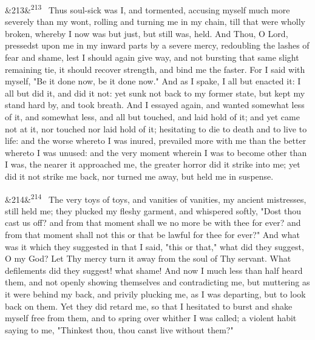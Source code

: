 \documentclass[12pt]{article}
\newcommand{\para}[1][]{\par\noindent\ifx&#1&\else\textsuperscript{\footnotesize #1}~\fi}
\begin{document}
\para[213] Thus soul-sick was I, and tormented, accusing myself much more severely than my wont, rolling and turning me in my chain, till that were wholly broken, whereby I now was but just, but still was, held. And Thou, O Lord, pressedst upon me in my inward parts by a severe mercy, redoubling the lashes of fear and shame, lest I should again give way, and not bursting that same slight remaining tie, it should recover strength, and bind me the faster. For I said with myself, "Be it done now, be it done now." And as I spake, I all but enacted it: I all but did it, and did it not: yet sunk not back to my former state, but kept my stand hard by, and took breath. And I essayed again, and wanted somewhat less of it, and somewhat less, and all but touched, and laid hold of it; and yet came not at it, nor touched nor laid hold of it; hesitating to die to death and to live to life: and the worse whereto I was inured, prevailed more with me than the better whereto I was unused: and the very moment wherein I was to become other than I was, the nearer it approached me, the greater horror did it strike into me; yet did it not strike me back, nor turned me away, but held me in suspense.

\para[214] The very toys of toys, and vanities of vanities, my ancient mistresses, still held me; they plucked my fleshy garment, and whispered softly, "Dost thou cast us off? and from that moment shall we no more be with thee for ever? and from that moment shall not this or that be lawful for thee for ever?" And what was it which they suggested in that I said, "this or that," what did they suggest, O my God? Let Thy mercy turn it away from the soul of Thy servant. What defilements did they suggest! what shame! And now I much less than half heard them, and not openly showing themselves and contradicting me, but muttering as it were behind my back, and privily plucking me, as I was departing, but to look back on them. Yet they did retard me, so that I hesitated to burst and shake myself free from them, and to spring over whither I was called; a violent habit saying to me, "Thinkest thou, thou canst live without them?"
\end{document}
